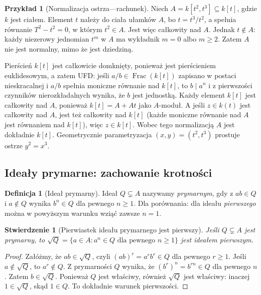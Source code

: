 \documentclass[11pt,a4paper,openany]{report}
\numberwithin{equation}{section}
\theoremstyle{plain}
\newtheorem{stwierdzenie}[twierdzenie]{Stwierdzenie}
\theoremstyle{definition}
\newtheorem{definicja}[twierdzenie]{Definicja}
\newtheorem{przyklad}[twierdzenie]{Przykład}
\theoremstyle{remark}
\newcommand{\Frac}{\operatorname{Frac}}
\begin{document}
\begin{przyklad}[Normalizacja ostrza---rachunek]
\label{prz:normalizacja-ostrza}
Niech $A=k[t^2,t^3]\subseteq k[t]$, gdzie $k$ jest ciałem.
Element $t$ należy do ciała ułamków $A$, bo
$t=t^3/t^2$, a spełnia równanie $T^2-t^2=0$,
w którym $t^2\in A$. Jest więc całkowity nad $A$.
Jednak $t\notin A$: każdy niezerowy jednomian $t^m$
w $A$ ma wykładnik $m=0$ albo $m\ge2$.
Zatem $A$ nie jest normalny, mimo że jest dziedziną.

Pierścień $k[t]$ jest całkowicie domknięty, ponieważ
jest pierścieniem euklidesowym, a zatem UFD: jeśli
$a/b\in\Frac(k[t])$ zapisano w postaci nieskracalnej
i $a/b$ spełnia moniczne równanie nad $k[t]$, to
$b\mid a^n$ i z pierwszości czynników nierozkładalnych
wynika, że $b$ jest jednostką. Każdy element $k[t]$
jest całkowity nad $A$, ponieważ
$k[t]=A+At$ jako $A$-moduł. A jeśli $z\in k(t)$
jest całkowity nad $A$, jest też całkowity nad $k[t]$
(każde moniczne równanie nad $A$ jest równaniem nad
$k[t]$), więc $z\in k[t]$. Wobec tego normalizacją
$A$ jest dokładnie $k[t]$.
Geometrycznie parametryzacja $(x,y)=(t^2,t^3)$
prostuje ostrze $y^2=x^3$.
\end{przyklad}

\subsection{Ideały prymarne: zachowanie krotności}
\begin{definicja}[Ideał prymarny]
Ideał $Q\subsetneq A$ nazywamy \emph{prymarnym},
gdy z $ab\in Q$ i $a\notin Q$ wynika
$b^n\in Q$ dla pewnego $n\ge1$.
Dla porównania: dla ideału \emph{pierwszego} można
w powyższym warunku wziąć zawsze $n=1$.
\end{definicja}

\begin{stwierdzenie}[Pierwiastek ideału prymarnego jest pierwszy]
Jeśli $Q\subsetneq A$ jest prymarny, to
$\sqrt Q=\{a\in A:a^n\in Q\text{ dla pewnego }n\ge1\}$
jest ideałem pierwszym.
\end{stwierdzenie}
\begin{proof}
Załóżmy, że $ab\in\sqrt Q$, czyli
$(ab)^r=a^rb^r\in Q$ dla pewnego $r\ge1$.
Jeśli $a\notin\sqrt Q$, to $a^r\notin Q$.
Z prymarności $Q$ wynika, że
$(b^r)^n=b^{rn}\in Q$ dla pewnego $n$.
Zatem $b\in\sqrt Q$. Ponieważ $Q$ jest właściwy,
również $\sqrt Q$ jest właściwy: inaczej
$1\in\sqrt Q$, skąd $1\in Q$. To dokładnie
warunek pierwszości.
\end{proof}
\end{document}
